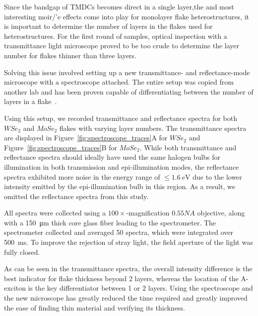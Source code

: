 \vspace{1cm}

Since the bandgap of TMDCs becomes direct in a single layer,the  and most interesting moir/'e effects come into play for monolayer flake heterostructures, it is important to determine the number of layers in the flakes used for heterostructures. 
For the first round of samples, optical inspection with a transmittance light microscope proved to be too crude to determine the layer number for flakes thinner than three layers.

Solving this issue involved setting up a new transmittance- and reflectance-mode microscope with a spectroscope attached. The entire setup was copied from another lab and has been proven capable of differentiating between the number of layers in a flake~\cite{frisendaMicroreflectanceTransmittanceSpectroscopy2017,niuThicknessDependentDifferentialReflectance2018}.

Using this setup, we recorded transmittance and reflectance spectra for both $WSe_2$ and $MoSe_2$ flakes with varying layer numbers.
%
The transmittance spectra are displayed in Figure~\ref{fig:spectroscope_traces}A for $WSe_2$ and Figure~\ref{fig:spectroscope_traces}B for $MoSe_2$. 
%
While both transmittance and reflectance spectra should ideally have used the same halogen bulbs for illumination in both transmission and epi-illumination modes, the reflectance spectra exhibited more noise in the energy range of $\leq \SI{1.6}{\electronvolt}$ due to the lower intensity emitted by the epi-illumination bulb in this region. As a result, we omitted the reflectance spectra from this study.

All spectra were collected using a $100\times$-magnification $0.55NA$ objective, along with a \SI{150}{\micro\meter} thick core glass fiber leading to the spectrometer. 
%
The spectrometer collected and averaged 50 spectra, which were integrated over \SI{500}{\milli\second}. To improve the rejection of stray light, the field aperture of the light was fully closed.

As can be seen in the transmittance spectra, the overall intensity difference is the best indicator for flake thickness beyond 2 layers, whereas the location of the A-exciton is the key differentiator between 1 or 2 layers. 
%
Using the spectroscope and the new microscope has greatly reduced the time required and greatly improved the ease of finding thin material and verifying its thickness.

